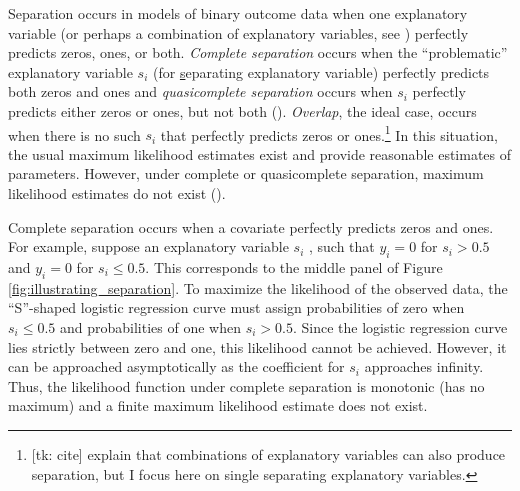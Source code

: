 \documentclass[12pt]{article}
\begin{document}
Separation occurs in models of binary outcome data when one explanatory variable (or perhaps a combination of explanatory variables, see \cite{LesaffreAlbert1989}) perfectly predicts zeros, ones, or both. \textit{Complete separation} occurs when the ``problematic'' explanatory variable $s_i$ (for \underline{s}eparating explanatory variable) perfectly predicts both zeros and ones and \textit{quasicomplete separation} occurs when $s_i$ perfectly predicts either zeros or ones, but not both (\citealt{AlbertAnderson1984, Zorn2005}). \textit{Overlap}, the ideal case, occurs when there is no such $s_i$ that perfectly predicts zeros or ones.\footnote{[tk: cite] explain that combinations of explanatory variables can also produce separation, but I focus here on single separating explanatory variables.} In this situation, the usual maximum likelihood estimates exist and provide reasonable estimates of parameters. However, under complete or quasicomplete separation, maximum likelihood estimates do not exist (\citealt{AlbertAnderson1984, Zorn2005}).

Complete separation occurs when a covariate perfectly predicts zeros and ones. For example, suppose an explanatory variable $s_i$ , such that $y_i = 0$ for $s_i > 0.5$ and $y_i = 0$ for $s_i \leq 0.5$. This corresponds to the middle panel of Figure \ref{fig:illustrating_separation}.  To maximize the likelihood of the observed data, the ``S''-shaped logistic regression curve must assign probabilities of zero when $s_i \leq 0.5$ and probabilities of one when $s_i > 0.5$. Since the logistic regression curve lies strictly between zero and one, this likelihood cannot be achieved. However, it can be approached asymptotically as the coefficient for $s_i$ approaches infinity. Thus, the likelihood function under complete separation is monotonic (has no maximum) and a finite maximum likelihood estimate does not exist.
\end{document}
